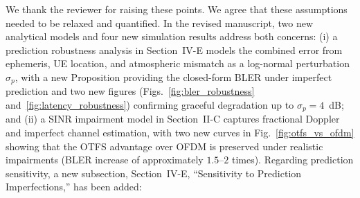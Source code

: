 We thank the reviewer for raising these points. We agree that these assumptions needed to be relaxed and quantified. In the revised manuscript, two new analytical models and four new simulation results address both concerns: (i) a prediction robustness analysis in Section~IV-E models the combined error from ephemeris, UE location, and atmospheric mismatch as a log-normal perturbation $\sigma_p$, with a new Proposition providing the closed-form BLER under imperfect prediction and two new figures (Figs.~\ref{fig:bler_robustness} and~\ref{fig:latency_robustness}) confirming graceful degradation up to $\sigma_p = 4$~dB; and (ii) a SINR impairment model in Section~II-C captures fractional Doppler and imperfect channel estimation, with two new curves in Fig.~\ref{fig:otfs_vs_ofdm} showing that the OTFS advantage over OFDM is preserved under realistic impairments (BLER increase of approximately $1.5$--$2$ times). Regarding prediction sensitivity, a new subsection, Section~IV-E, ``Sensitivity to Prediction Imperfections,'' has been added:

